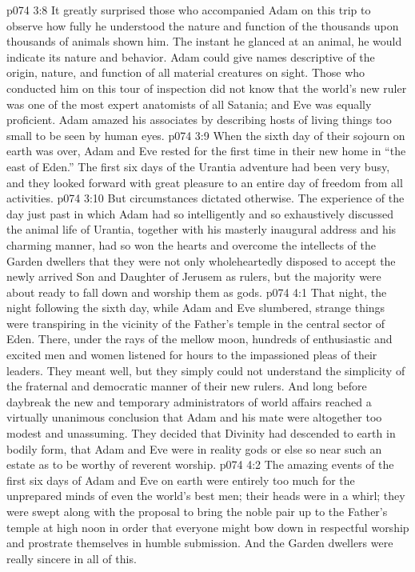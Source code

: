 \vs p074 3:8 It greatly surprised those who accompanied Adam on this trip to observe how fully he understood the nature and function of the thousands upon thousands of animals shown him. The instant he glanced at an animal, he would indicate its nature and behavior. Adam could give names descriptive of the origin, nature, and function of all material creatures on sight. Those who conducted him on this tour of inspection did not know that the world’s new ruler was one of the most expert anatomists of all Satania; and Eve was equally proficient. Adam amazed his associates by describing hosts of living things too small to be seen by human eyes.
\vs p074 3:9 When the sixth day of their sojourn on earth was over, Adam and Eve rested for the first time in their new home in “the east of Eden.” The first six days of the Urantia adventure had been very busy, and they looked forward with great pleasure to an entire day of freedom from all activities.
\vs p074 3:10 But circumstances dictated otherwise. The experience of the day just past in which Adam had so intelligently and so exhaustively discussed the animal life of Urantia, together with his masterly inaugural address and his charming manner, had so won the hearts and overcome the intellects of the Garden dwellers that they were not only wholeheartedly disposed to accept the newly arrived Son and Daughter of Jerusem as rulers, but the majority were about ready to fall down and worship them as gods.
\vs p074 4:1 That night, the night following the sixth day, while Adam and Eve slumbered, strange things were transpiring in the vicinity of the Father’s temple in the central sector of Eden. There, under the rays of the mellow moon, hundreds of enthusiastic and excited men and women listened for hours to the impassioned pleas of their leaders. They meant well, but they simply could not understand the simplicity of the fraternal and democratic manner of their new rulers. And long before daybreak the new and temporary administrators of world affairs reached a virtually unanimous conclusion that Adam and his mate were altogether too modest and unassuming. They decided that Divinity had descended to earth in bodily form, that Adam and Eve were in reality gods or else so near such an estate as to be worthy of reverent worship.\plusone
\vs p074 4:2 The amazing events of the first six days of Adam and Eve on earth were entirely too much for the unprepared minds of even the world’s best men; their heads were in a whirl; they were swept along with the proposal to bring the noble pair up to the Father’s temple at high noon in order that everyone might bow down in respectful worship and prostrate themselves in humble submission. And the Garden dwellers were really sincere in all of this.
